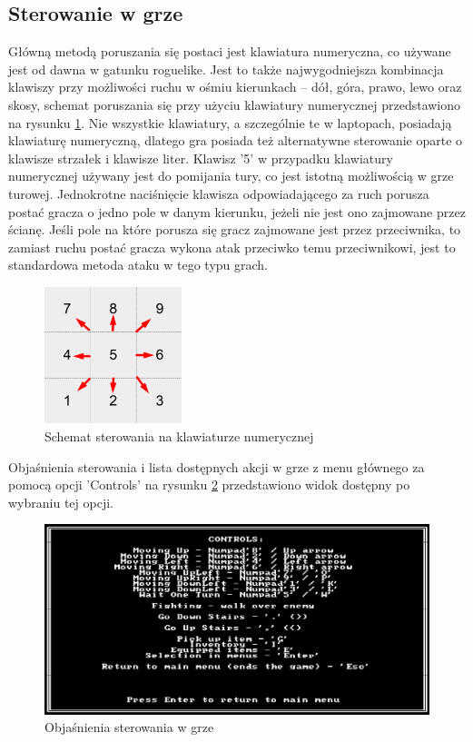 \documentclass[12pt,twoside]{article}
\begin{document}
\subsection{Sterowanie w grze}
 Główną metodą poruszania się postaci jest klawiatura numeryczna, co używane jest od dawna w gatunku roguelike. Jest to także najwygodniejsza kombinacja klawiszy przy możliwości ruchu w ośmiu kierunkach -- dół, góra, prawo, lewo oraz skosy, schemat poruszania się przy użyciu klawiatury numerycznej przedstawiono na rysunku \ref{numpad_controls}. Nie wszystkie klawiatury, a szczególnie te w laptopach, posiadają klawiaturę numeryczną, dlatego gra posiada też alternatywne sterowanie oparte o klawisze strzałek i klawisze liter. Klawisz '5' w przypadku klawiatury numerycznej używany jest do pomijania tury, co jest istotną możliwością w grze turowej. Jednokrotne naciśnięcie klawisza odpowiadającego za ruch porusza postać gracza o jedno pole w danym kierunku, jeżeli nie jest ono zajmowane przez ścianę. Jeśli pole na które porusza się gracz zajmowane jest przez przeciwnika, to zamiast ruchu postać gracza wykona atak przeciwko temu przeciwnikowi, jest to standardowa metoda ataku w tego typu grach.
 
\FloatBarrier
\begin{figure}[ht]
	\centering
	\includegraphics[width=4cm]{images/custom/numpad_controls.png}
	\caption{Schemat sterowania na klawiaturze numerycznej}
	\label{numpad_controls}
\end{figure}
\FloatBarrier

Objaśnienia sterowania i lista dostępnych akcji w grze z menu głównego za pomocą opcji 'Controls' na rysunku \ref{mygame:scr2} przedstawiono widok dostępny po wybraniu tej opcji.

\FloatBarrier
\begin{figure}[ht]
	\centering
	\includegraphics[width=16cm]{images/mygame/scr2.png}
	\caption{Objaśnienia sterowania w grze}
	\label{mygame:scr2}
\end{figure}
\FloatBarrier
\end{document}
